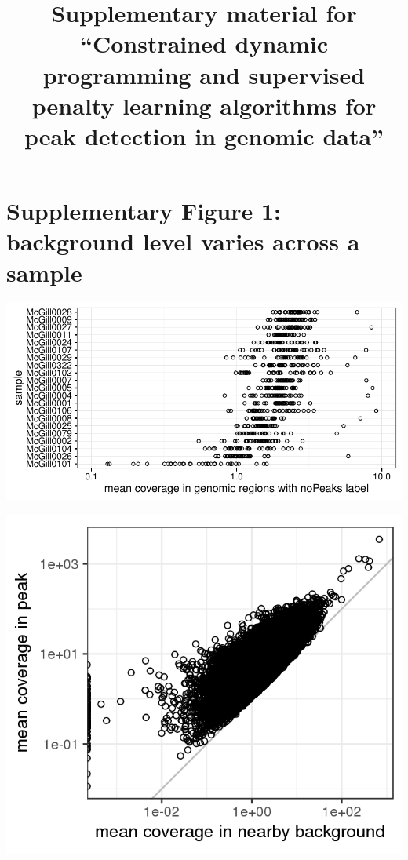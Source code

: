 \documentclass{article}
\title{Supplementary material for ``Constrained dynamic programming and supervised
penalty learning algorithms for 
peak detection in genomic data''}
\begin{document}
\maketitle

\section*{Supplementary Figure 1: background level varies across a sample}

\parbox{0.55\textwidth}{
\includegraphics[width=\linewidth]{figure-background}
}\parbox{0.4\textwidth}{
\includegraphics[width=\linewidth]{figure-background-peak-mean-density-scatter}
}
\end{document}

